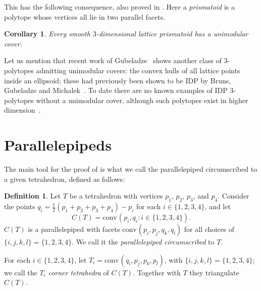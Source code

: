 \documentclass{amsart}
\theoremstyle{plain}
\newtheorem{corollary}[theorem]{Corollary}
\theoremstyle{definition}
\newtheorem{definition}[theorem]{Definition}
\newcommand{\conv}{\ensuremath{\mathrm{conv}}\hspace{1pt}}
\begin{document}
This has the following consequence, also proved in .
Here a  \emph{prismatoid} is a polytope whose vertices all lie in two parallel facets. 


\begin{corollary}
\label{coro:prismatoid}
Every smooth $3$-dimensional lattice prismatoid has a unimodular cover.
\end{corollary}

Let us mention that recent work of Gubeladze~\cite{Gubeladze} shows another class of 3-polytopes admitting unimodular covers: the convex hulls of all lattice points inside an ellipsoid; these had previously been shown to be IDP by Bruns, Gubeladze and Michalek~\cite{BGM}.
To date there are no known examples of IDP $3$-polytopes without a unimodular cover, although such polytopes exist in higher dimension~\cite{BG}.




\section{Parallelepipeds}
\label{sec:parallelepipeds}

The main tool for the proof of  is what we call the parallelepiped circumscribed to a given tetrahedron, defined as follows:

\begin{definition}
\label{def:circunpara}
Let $T$ be a tetrahedron with vertices $p_1$, $p_2$, $p_3$, and $p_4$. Consider the points $q_i= \frac12 (p_1+p_2+p_3+p_4) - p_i$ for each $i\in \{1,2,3,4\}$, and let
\[
C(T)=\conv(p_i,q_i: i\in\{1,2,3,4\}).
\] 
$C(T)$ is a parallelepiped with facets $\conv(p_i, p_j, q_k, q_l)$ for all choices of $\{i,j,k,l\}=\{1,2,3,4\}$. We call it the \emph{parallelepiped circumscribed} to $T$.

For each $i \in \{1,2,3,4\}$, let $T_i=\conv(q_i, p_j, p_k, p_l)$, with $\{i,j,k,l\}=\{1,2,3,4\}$; we call the $T_i$ \emph{corner tetrahedra} of $C(T)$. Together with $T$ they triangulate $C(T)$.
\end{definition}
\end{document}
